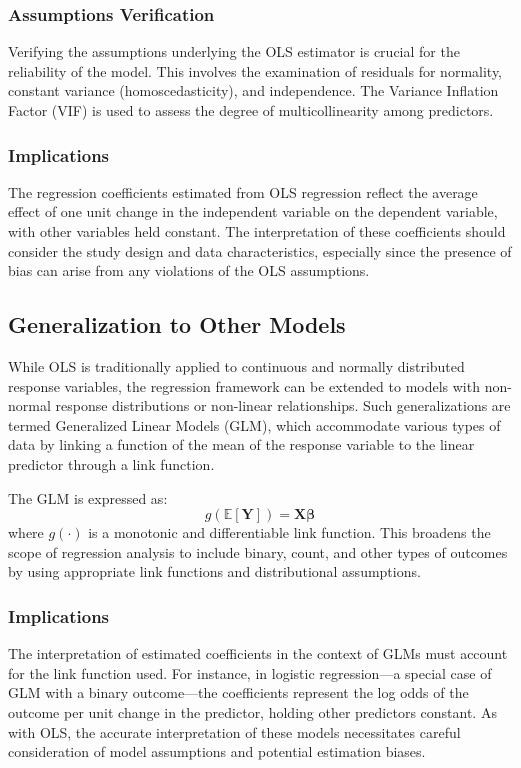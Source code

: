 \documentclass{aip-cp}
\begin{document}
\subsubsection{Assumptions Verification}
Verifying the assumptions underlying the OLS estimator is crucial for the reliability of the model. This involves the examination of residuals for normality, constant variance (homoscedasticity), and independence. The Variance Inflation Factor (VIF) is used to assess the degree of multicollinearity among predictors.
\subsubsection{Implications}
The regression coefficients estimated from OLS regression reflect the average effect of one unit change in the independent variable on the dependent variable, with other variables held constant. The interpretation of these coefficients should consider the study design and data characteristics, especially since the presence of bias can arise from any violations of the OLS assumptions.

\subsection{Generalization to Other Models}
While OLS is traditionally applied to continuous and normally distributed response variables, the regression framework can be extended to models with non-normal response distributions or non-linear relationships. Such generalizations are termed Generalized Linear Models (GLM), which accommodate various types of data by linking a function of the mean of the response variable to the linear predictor through a link function.

The GLM is expressed as:
\begin{equation}
    g(\mathbb{E}[\mathbf{Y}]) = \mathbf{X}\bm{\beta}
\end{equation}
where \(g(\cdot)\) is a monotonic and differentiable link function. This broadens the scope of regression analysis to include binary, count, and other types of outcomes by using appropriate link functions and distributional assumptions.

\subsubsection{Implications}
The interpretation of estimated coefficients in the context of GLMs must account for the link function used. For instance, in logistic regression—a special case of GLM with a binary outcome—the coefficients represent the log odds of the outcome per unit change in the predictor, holding other predictors constant. As with OLS, the accurate interpretation of these models necessitates careful consideration of model assumptions and potential estimation biases.
\end{document}
